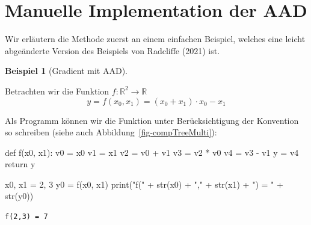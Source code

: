 \documentclass[
  a4paper,
  DIV=11]{scrreprt}
\newenvironment{Shaded}{\begin{snugshade}}{\end{snugshade}}
\newcommand{\BuiltInTok}[1]{\textcolor[rgb]{0.00,0.23,0.31}{#1}}
\newcommand{\ControlFlowTok}[1]{\textcolor[rgb]{0.00,0.23,0.31}{#1}}
\newcommand{\DecValTok}[1]{\textcolor[rgb]{0.68,0.00,0.00}{#1}}
\newcommand{\KeywordTok}[1]{\textcolor[rgb]{0.00,0.23,0.31}{#1}}
\newcommand{\NormalTok}[1]{\textcolor[rgb]{0.00,0.23,0.31}{#1}}
\newcommand{\OperatorTok}[1]{\textcolor[rgb]{0.37,0.37,0.37}{#1}}
\newcommand{\StringTok}[1]{\textcolor[rgb]{0.13,0.47,0.30}{#1}}
\theoremstyle{definition}
\theoremstyle{definition}
\newtheorem{example}{Beispiel}[chapter]
\theoremstyle{remark}
\begin{document}
\hypertarget{manuelle-implementation-der-aad}{%
\section{Manuelle Implementation der
AAD}\label{manuelle-implementation-der-aad}}

Wir erläutern die Methode zuerst an einem einfachen Beispiel, welches
eine leicht abgeänderte Version des Beispiels von Radcliffe (2021) ist.

\begin{example}[Gradient mit
AAD]\protect\hypertarget{exm-firstAADbyHand}{}\label{exm-firstAADbyHand}

Betrachten wir die Funktion \(f : \mathbb{R}^2 \rightarrow \mathbb{R}\)
\[
y = f(x_0, x_1) = (x_0 + x_1) \cdot x_0 - x_1
\]

Als Programm können wir die Funktion unter Berücksichtigung der
Konvention so schreiben (siehe auch Abbildung~\ref{fig-compTreeMulti}):

\begin{Shaded}
\begin{Highlighting}[]
\KeywordTok{def}\NormalTok{ f(x0, x1):}
\NormalTok{    v0 }\OperatorTok{=}\NormalTok{ x0}
\NormalTok{    v1 }\OperatorTok{=}\NormalTok{ x1}
\NormalTok{    v2 }\OperatorTok{=}\NormalTok{ v0 }\OperatorTok{+}\NormalTok{ v1}
\NormalTok{    v3 }\OperatorTok{=}\NormalTok{ v2 }\OperatorTok{*}\NormalTok{ v0}
\NormalTok{    v4 }\OperatorTok{=}\NormalTok{ v3 }\OperatorTok{{-}}\NormalTok{ v1}
\NormalTok{    y }\OperatorTok{=}\NormalTok{ v4}
    \ControlFlowTok{return}\NormalTok{ y}

\NormalTok{x0, x1 }\OperatorTok{=} \DecValTok{2}\NormalTok{, }\DecValTok{3}
\NormalTok{y0 }\OperatorTok{=}\NormalTok{ f(x0, x1)}
\BuiltInTok{print}\NormalTok{(}\StringTok{"f("} \OperatorTok{+} \BuiltInTok{str}\NormalTok{(x0) }\OperatorTok{+} \StringTok{","} \OperatorTok{+} \BuiltInTok{str}\NormalTok{(x1) }\OperatorTok{+} \StringTok{") = "} \OperatorTok{+} \BuiltInTok{str}\NormalTok{(y0))}
\end{Highlighting}
\end{Shaded}

\begin{verbatim}
f(2,3) = 7
\end{verbatim}

\begin{figure}

{\centering 

\begin{figure}[H]


\end{figure}}
\end{figure}
\end{example}
\end{document}
